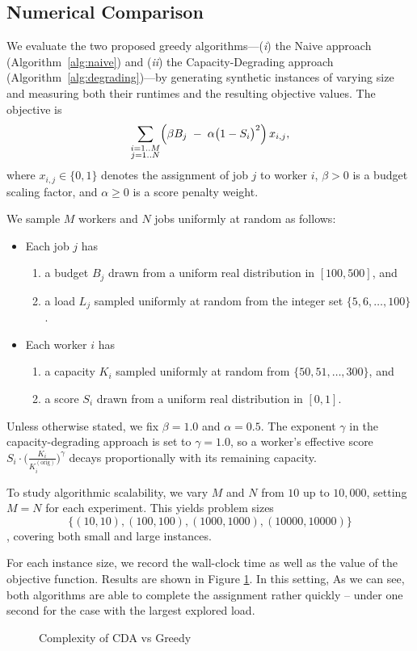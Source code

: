 \documentclass{article}
\begin{document}
\subsection{Numerical Comparison}


We evaluate the two proposed greedy algorithms---(\emph{i}) the Naive approach (Algorithm~\ref{alg:naive}) and (\emph{ii}) the Capacity-Degrading approach (Algorithm~\ref{alg:degrading})---by generating synthetic instances of varying size and measuring both their runtimes and the resulting objective values. The objective is 
\[
  \sum_{\substack{i=1..M \\ j=1..N}} 
  \Bigl(\beta B_j \;-\;\alpha\bigl(1-S_i\bigr)^2\Bigr)\,x_{i,j},
\]
where $x_{i,j}\in\{0,1\}$ denotes the assignment of job $j$ to worker $i$, $\beta>0$ is a budget scaling factor, and $\alpha\ge0$ is a score penalty weight.

We sample $M$ workers and $N$ jobs uniformly at random as follows:
\begin{itemize}
    \item Each job $j$ has 
    \begin{enumerate}
        \item a budget $B_j$ drawn from a uniform real distribution in $[100, 500]$, and 
        \item a load $L_j$ sampled uniformly at random from the integer set $\{5, 6, \dots, 100\}$.
    \end{enumerate}
    \item Each worker $i$ has 
    \begin{enumerate}
        \item a capacity $K_i$ sampled uniformly at random from $\{50, 51, \dots, 300\}$, and 
        \item a score $S_i$ drawn from a uniform real distribution in $[0, 1]$.
    \end{enumerate}
\end{itemize}

Unless otherwise stated, we fix $\beta=1.0$ and $\alpha=0.5$. The exponent $\gamma$ in the capacity-degrading approach is set to $\gamma=1.0$, so a worker's effective score $S_i\cdot\bigl(\tfrac{K_i}{K_i^{(\mathrm{orig})}}\bigr)^\gamma$ decays proportionally with its remaining capacity.

To study algorithmic scalability, we vary $M$ and $N$ from $10$ up to $10{,}000$, setting $M=N$ for each experiment. This yields problem sizes $$\{(10,10), (100,100), (1000,1000), (10000,10000)\}$$, covering both small and large instances.

For each instance size, we record the wall-clock time as well as the value of the objective function. Results are shown in Figure \ref{fig:complexity_CDA_Greedy}. In this setting, As we can see, both algorithms are able to complete the assignment rather quickly -- under one second for the case with the largest explored load. 

\begin{figure}
    \centering
    
    \caption{Complexity of CDA vs Greedy}
    \label{fig:complexity_CDA_Greedy}
\end{figure}
\end{document}
